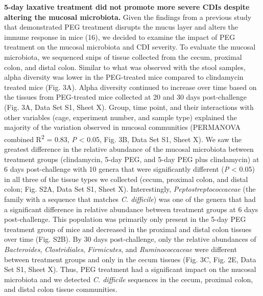 \documentclass[
  11pt,
]{article}
\begin{document}
\textbf{5-day laxative treatment did not promote more severe CDIs
despite altering the mucosal microbiota.} Given the findings from a
previous study that demonstrated PEG treatment disrupts the mucus layer
and alters the immune response in mice (16), we decided to examine the
impact of PEG treatment on the mucosal microbiota and CDI severity. To
evaluate the mucosal microbiota, we sequenced snips of tissue collected
from the cecum, proximal colon, and distal colon. Similar to what was
observed with the stool samples, alpha diversity was lower in the
PEG-treated mice compared to clindamycin treated mice (Fig. 3A). Alpha
diversity continued to increase over time based on the tissues from
PEG-treated mice collected at 20 and 30 days post-challenge (Fig. 3A,
Data Set S1, Sheet X). Group, time point, and their interactions with
other variables (cage, experiment number, and sample type) explained the
majority of the variation observed in mucosal communities (PERMANOVA
combined R\textsuperscript{2} = 0.83, \emph{P} \textless{} 0.05, Fig.
3B, Data Set S1, Sheet X). We saw the greatest difference in the
relative abundance of the mucosal microbiota between treatment groups
(clindamycin, 5-day PEG, and 5-day PEG plus clindamycin) at 6 days
post-challenge with 10 genera that were significantly different
(\emph{P} \textless{} 0.05) in all three of the tissue types we
collected (cecum, proximal colon, and distal colon; Fig. S2A, Data Set
S1, Sheet X). Interestingly, \emph{Peptostreptococcaceae} (the family
with a sequence that matches \emph{C. difficile}) was one of the genera
that had a significant difference in relative abundance between
treatment groups at 6 days post-challenge. This population was primarily
only present in the 5-day PEG treatment group of mice and decreased in
the proximal and distal colon tissues over time (Fig. S2B). By 30 days
post-challenge, only the relative abundances of \emph{Bacteroides},
\emph{Clostridiales}, \emph{Firmicutes}, and \emph{Ruminococcaceae} were
different between treatment groups and only in the cecum tissues (Fig.
3C, Fig. 2E, Data Set S1, Sheet X). Thus, PEG treatment had a
significant impact on the mucosal microbiota and we detected \emph{C.
difficile} sequences in the cecum, proximal colon, and distal colon
tissue communities.
\end{document}

